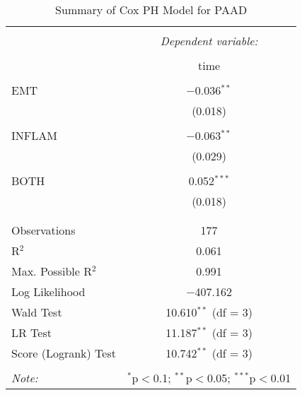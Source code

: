 
\begin{table}[!htbp] \centering 
  \caption{Summary of Cox PH Model for PAAD} 
  \label{table:PAAD_cph} 
\begin{tabular}{@{\extracolsep{5pt}}lc} 
\\[-1.8ex]\hline 
\hline \\[-1.8ex] 
 & \multicolumn{1}{c}{\textit{Dependent variable:}} \\ 
\cline{2-2} 
\\[-1.8ex] & time \\ 
\hline \\[-1.8ex] 
 EMT & $-$0.036$^{**}$ \\ 
  & (0.018) \\ 
  & \\ 
 INFLAM & $-$0.063$^{**}$ \\ 
  & (0.029) \\ 
  & \\ 
 BOTH & 0.052$^{***}$ \\ 
  & (0.018) \\ 
  & \\ 
\hline \\[-1.8ex] 
Observations & 177 \\ 
R$^{2}$ & 0.061 \\ 
Max. Possible R$^{2}$ & 0.991 \\ 
Log Likelihood & $-$407.162 \\ 
Wald Test & 10.610$^{**}$ (df = 3) \\ 
LR Test & 11.187$^{**}$ (df = 3) \\ 
Score (Logrank) Test & 10.742$^{**}$ (df = 3) \\ 
\hline 
\hline \\[-1.8ex] 
\textit{Note:}  & \multicolumn{1}{r}{$^{*}$p$<$0.1; $^{**}$p$<$0.05; $^{***}$p$<$0.01} \\ 
\end{tabular} 
\end{table} 
